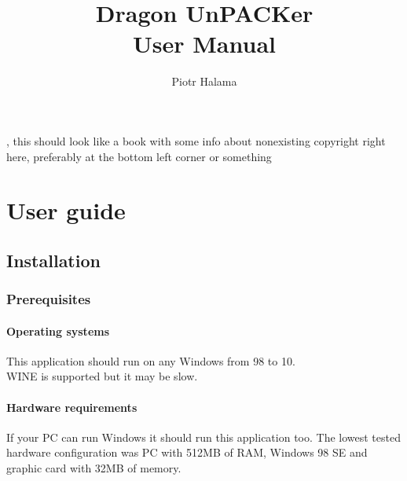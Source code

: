 \documentclass[10pt,a4paper,twoside]{book}
\author{Piotr Halama}
\title{Dragon UnPACKer\\
		User Manual}
\begin{document}
\maketitle
\thispagestyle{empty}
\vspace*{\fill}
, this should look like a book with some info about nonexisting copyright right here, preferably at the bottom left corner or something
\tableofcontents
\newpage

\part{User guide}
\chapter{Installation}
\section{Prerequisites}
\subsection{Operating systems}
This application should run on any Windows from 98 to 10.\\
WINE is supported but it may be slow.
\subsection{Hardware requirements}
If your PC can run Windows it should run this application too.
The lowest tested hardware configuration was PC with 512MB of RAM, Windows 98 SE and graphic card with 32MB of memory.
\newpage
\end{document}
